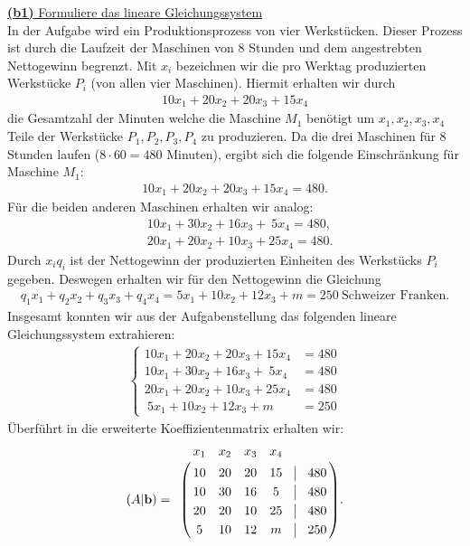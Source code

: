 \underline{\textbf{(b1)} Formuliere das lineare Gleichungssystem}\\
In der Aufgabe wird ein Produktionsprozess von vier Werkstücken.
Dieser Prozess ist durch die Laufzeit der Maschinen von $8$ Stunden und dem angestrebten Nettogewinn begrenzt.
Mit $x_i$ bezeichnen wir die pro Werktag produzierten Werkstücke $P_i$ (von allen vier Maschinen). Hiermit erhalten wir durch
\begin{align*}
	10 x_1 + 20 x_2 + 20 x_3 + 15 x_4
\end{align*}
die Gesamtzahl der Minuten welche die Maschine $M_1$ benötigt um $x_1,x_2, x_3, x_4$ Teile der Werkstücke $P_1, P_2 , P_3, P_4$ zu produzieren. Da die drei Maschinen für $8$ Stunden laufen ($8 \cdot 60 = 480$ Minuten), ergibt sich die folgende Einschränkung für Maschine $M_1$:
\begin{align*}
	10 x_1 + 20 x_2 + 20 x_3 + 15 x_4  =480.
\end{align*}
\newpage
Für die beiden anderen Maschinen erhalten wir analog:
\begin{align*}
	&10 x_1 + 30 x_2 + 16 x_3 +  \ 5 x_4  =480,\\
	&20 x_1 + 20 x_2 + 10 x_3 + 25 x_4  =480.
\end{align*}
Durch $x_i q_i$ ist der Nettogewinn der produzierten Einheiten des Werkstücks $P_i$ gegeben. Deswegen erhalten wir für den Nettogewinn die Gleichung
\begin{align*}
	q_1 x_1 + q_2 x_2 + q_3 x_3 + q_4 x_4 = 
	5 x_1 + 10 x_2 + 12 x_3 + m  = 250 \ \text{Schweizer Franken}.
\end{align*}
Insgesamt konnten wir aus der Aufgabenstellung das folgenden lineare Gleichungssystem extrahieren:
\begin{align*}
	\begin{cases}
		10 x_1 + 20 x_2 + 20 x_3 + 15 x_4  &=480 \\
		10 x_1 + 30 x_2 + 16 x_3 +  \ 5 x_4  &=480\\
		20 x_1 + 20 x_2 + 10 x_3 + 25 x_4  &=480\\
		\ 5 x_1 + 10 x_2 + 12 x_3 + m  &= 250
	\end{cases}
\end{align*}
Überführt in die erweiterte Koeffizientenmatrix erhalten wir:
\begin{align*}
(A | \mathbf{b}) =	\bordermatrix{ & x_1 & x_2 & x_3 & x_4 & &  \cr
		& 10 & 20 & 20 &  15 & \BAR & 480 \cr
		& 10 & 30 & 16& 5 &\BAR & 480 \cr
		& 20 & 20 & 10 & 25 &  \BAR & 480  \cr 
		& 5 & 10 & 12 & m & \BAR & 250}.
\end{align*}
